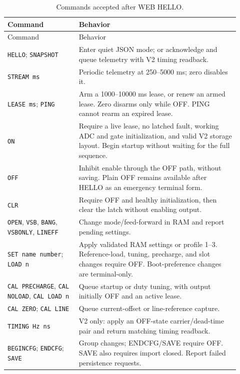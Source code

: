 \begingroup
\small
\begin{longtable}{@{}L{0.29\linewidth}L{0.63\linewidth}@{}}
\caption{Commands accepted after WEB HELLO.}\label{tab:app-fw-web-commands}\\
\toprule Command & Behavior\\\midrule
\endfirsthead
\toprule Command & Behavior\\\midrule
\endhead
\texttt{HELLO}; \texttt{SNAPSHOT} & Enter quiet JSON mode; or acknowledge and queue telemetry with V2 timing readback.\\
\texttt{STREAM ms} & Periodic telemetry at 250--5000 ms; zero disables it.\\
\texttt{LEASE ms}; \texttt{PING} & Arm a 1000--10000 ms lease, or renew an armed lease. Zero disarms only while OFF. PING cannot rearm an expired lease.\\
\texttt{ON} & Require a live lease, no latched fault, working ADC and gate initialization, and valid V2 storage layout. Begin startup without waiting for the full sequence.\\
\texttt{OFF} & Inhibit enable through the OFF path, without saving. Plain OFF remains available after HELLO as an emergency terminal form.\\
\texttt{CLR} & Require OFF and healthy initialization, then clear the latch without enabling output.\\
\texttt{OPEN}, \texttt{VSB}, \texttt{BANG}, \texttt{VSBONLY}, \texttt{LINEFF} & Change mode/feed-forward in RAM and report pending settings.\\
\texttt{SET name number}; \texttt{LOAD n} & Apply validated RAM settings or profile 1--3. Reference-load, tuning, precharge, and slot changes require OFF. Boot-preference changes are terminal-only.\\
\texttt{CAL PRECHARGE}, \texttt{CAL NOLOAD}, \texttt{CAL LOAD n} & Queue startup or duty tuning, with output initially OFF and an active lease.\\
\texttt{CAL ZERO}; \texttt{CAL LINE} & Queue current-offset or line-reference capture.\\
\texttt{TIMING Hz ns} & V2 only: apply an OFF-state carrier/dead-time pair and return matching timing readback.\\
\texttt{BEGINCFG}; \texttt{ENDCFG}; \texttt{SAVE} & Group changes; ENDCFG/SAVE require OFF. SAVE also requires import closed. Report failed persistence requests.\\
\bottomrule
\end{longtable}
\endgroup

